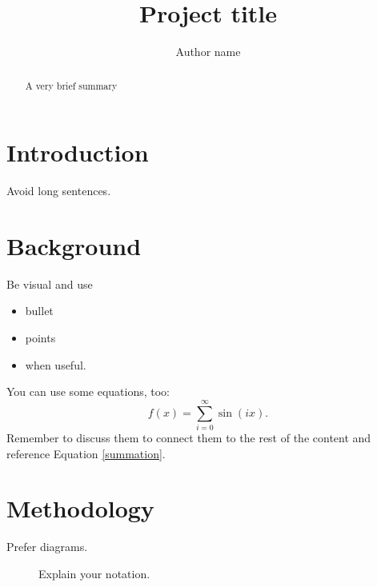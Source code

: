\documentclass[a0]{sciposter} %
\title{Project title}
\author{Author name}
\institute{Author affiliation}
\begin{document}

\maketitle
\begin{abstract}
A very brief summary
\end{abstract}

\begin{multicols}{2} 

\section{Introduction}

Avoid long sentences.

\lipsum[2-4]

\section{Background}

Be visual \citet{ai} and use
\begin{itemize}
\item bullet
\item points
\item when useful.
\end{itemize}

You can use some equations, too:
\begin{equation}
    f(x) = \sum_{i = 0}^\infty \sin(i x).
    \label{summation}
\end{equation}
Remember to discuss them to connect them to the rest of the content
and reference Equation \eqref{summation}.

\section{Methodology}

Prefer diagrams.

\begin{figure}
\captionsetup{type=figure} %
\setcounter{figure}{0} %
\begin{center}
\end{center}
\caption{Explain your notation.}
\label{diag}
\end{figure}


\end{multicols}
\end{document}
